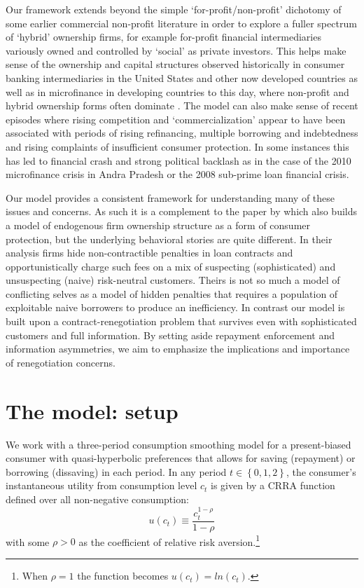 \documentclass[11pt,english]{article}
\theoremstyle{plain}
\theoremstyle{definition}
\begin{document}
Our framework extends beyond the simple `for-profit/non-profit' dichotomy
of some earlier commercial non-profit literature in order to explore
a fuller spectrum of `hybrid' ownership firms, for example for-profit financial
intermediaries variously owned and controlled by `social' as private investors. This helps make sense of the ownership and
capital structures observed historically in consumer banking intermediaries
in the United States and other now developed countries as well as
in microfinance in developing countries to this day, where non-profit
and hybrid ownership forms often dominate \citep{cull2009}. The model
can also make sense of recent episodes where rising competition and
`commercialization' appear to have been associated with periods of
rising refinancing, multiple borrowing and indebtedness and rising
complaints of insufficient consumer protection. In some instances
this has led to financial crash and strong political backlash as in
the case of the 2010 microfinance crisis in Andra Pradesh or the 2008
sub-prime loan financial crisis.

Our model provides a consistent framework for understanding many of
these issues and concerns. As such it is a complement to the paper
by \citet{bubb_consumer_2013} which also builds a model of endogenous
firm ownership structure as a form of consumer protection, but the
underlying behavioral stories are quite different. In their analysis
firms hide non-contractible penalties in loan contracts and opportunistically
charge such fees on a mix of suspecting (sophisticated) and unsuspecting
(naive) risk-neutral customers. Theirs is not so much a model of conflicting
selves as a model of hidden penalties that requires a population of
exploitable naive borrowers to produce an inefficiency. In contrast
our model is built upon a contract-renegotiation problem that survives
even with sophisticated customers and full information. By setting
aside repayment enforcement and information asymmetries, we aim to
emphasize the implications and importance of renegotiation concerns.

\section{The model: setup}

We work with a three-period consumption smoothing model for a present-biased
consumer with quasi-hyperbolic preferences that allows for saving
(repayment) or borrowing (dissaving) in each period. In any period
$t\in\left\{ 0,1,2\right\} $, the consumer's instantaneous utility
from consumption level $c_{t}$ is given by a CRRA function defined
over all non-negative consumption: 
\begin{equation}
u\left(c_{t}\right)\equiv\frac{c_{t}^{1-\rho}}{1-\rho}
\end{equation}
with some $\rho>0$ as the coefficient of relative risk aversion.\footnote{When $\rho=1$ the function becomes $u(c_{t})=ln(c_{t})$.}
\end{document}
